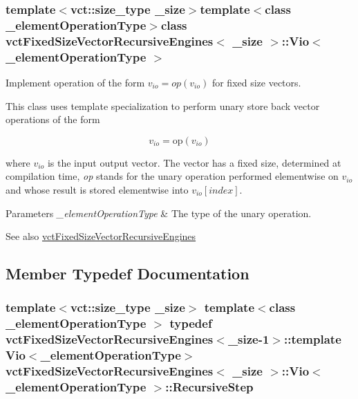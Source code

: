 \subsubsection*{template$<$vct\+::size\+\_\+type \+\_\+size$>$template$<$class \+\_\+element\+Operation\+Type$>$class vct\+Fixed\+Size\+Vector\+Recursive\+Engines$<$ \+\_\+size $>$\+::\+Vio$<$ \+\_\+element\+Operation\+Type $>$}

Implement operation of the form $v_{io} = op(v_{io})$ for fixed size vectors. 

This class uses template specialization to perform unary store back vector operations of the form

\[ v_{io} = \mathrm{op}(v_{io}) \]

where $v_{io}$ is the input output vector. The vector has a fixed size, determined at compilation time, {\itshape op} stands for the unary operation performed elementwise on $v_{io}$ and whose result is stored elementwise into $v_{io}[index]$.


\begin{DoxyParams}{Parameters}
{\em \+\_\+element\+Operation\+Type} & The type of the unary operation.\\
\hline
\end{DoxyParams}
\begin{DoxySeeAlso}{See also}
\hyperlink{classvct_fixed_size_vector_recursive_engines}{vct\+Fixed\+Size\+Vector\+Recursive\+Engines} 
\end{DoxySeeAlso}


\subsection{Member Typedef Documentation}
\hypertarget{classvct_fixed_size_vector_recursive_engines_1_1_vio_ab8636d835afe64d6831799cc7ce45d27}{}
\subsubsection[{Recursive\+Step}]{\setlength{\rightskip}{0pt plus 5cm}template$<$vct\+::size\+\_\+type \+\_\+size$>$ template$<$class \+\_\+element\+Operation\+Type $>$ typedef {\bf vct\+Fixed\+Size\+Vector\+Recursive\+Engines}$<$\+\_\+size-\/1$>$\+::template {\bf Vio}$<$\+\_\+element\+Operation\+Type$>$ {\bf vct\+Fixed\+Size\+Vector\+Recursive\+Engines}$<$ \+\_\+size $>$\+::{\bf Vio}$<$ \+\_\+element\+Operation\+Type $>$\+::{\bf Recursive\+Step}}\label{classvct_fixed_size_vector_recursive_engines_1_1_vio_ab8636d835afe64d6831799cc7ce45d27}


